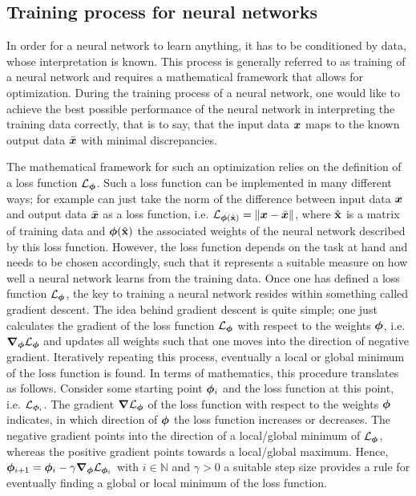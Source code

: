 \documentclass[a4paper,12pt]{report}
\def\lk#1{{\color{black}{#1}}}
\begin{document}
\subsection{Training process for neural networks}\label{sec:training}
In order for a neural network to learn anything, it has to be conditioned by data, whose interpretation is known. This process is generally referred to as training of a neural network and requires a mathematical framework that allows for optimization. During the training process of a neural network, one would like to achieve the best possible performance of the neural network in interpreting the training data correctly, that is to say, that the input data $\bm{x}$ maps to the known output data $\bar{\bm{x}}$ with minimal discrepancies.

The mathematical framework for such an optimization relies on the definition of a loss function $\mathcal{L}_{\bm{\phi}}$. Such a loss function can be implemented in many different ways; for example \lk{one} can just take the norm of the difference between input data $\bm{x}$ and output data $\bar{\bm{x}}$ as a loss function, i.e. $\mathcal{L}_{\bm{\phi}(\hat{\boldsymbol{\mathbf{x}}})} = \|\bm{x}-\bar{\bm{x}}\|$, where $\hat{\boldsymbol{\mathbf{x}}}$ is a matrix of training data and $\bm{\phi}(\hat{\boldsymbol{\mathbf{x}}})$ the associated weights of the neural network described by this loss function. However, the loss function depends on the task at hand and needs to be chosen accordingly, such that it represents a suitable measure on how well a neural network learns from the training data. Once one has defined a loss function $\mathcal{L}_{\bm{\phi}}$, the key to training a neural network resides within something called gradient descent. The idea behind gradient descent is quite simple; one just calculates the gradient of the loss function $\mathcal{L}_{\bm{\phi}}$ with respect to the weights $\bm{\phi}$, i.e. $\bm{\nabla}_{\bm{\phi}}\mathcal{L}_{\bm{\phi}}$ and updates all weights such that one moves into the direction of negative gradient. Iteratively repeating this process, eventually a local or global minimum of the loss function is found. In terms of mathematics, this procedure translates as follows. Consider some starting point $\bm{\phi}_i$ and the loss function at this point, i.e. $\mathcal{L}_{\bm{\phi}_i}$. The gradient $\bm{\nabla}\mathcal{L}_{\bm{\phi}}$ of the loss function with respect to the weights $\bm{\phi}$ indicates, in which direction of $\bm{\phi}$ the loss function increases or decreases. The negative gradient points into the direction of a local/global minimum of $\mathcal{L}_{\bm{\phi}}$, whereas the positive gradient points towards a local/global maximum. Hence, $\bm{\phi}_{i+1} = \bm{\phi}_{i} - \gamma \bm{\nabla}_{\bm{\phi}}\mathcal{L}_{\bm{\phi}_i}$ with $i \in \mathbb{N}$ and $\gamma > 0$ a suitable step size provides a rule for eventually finding a global or local minimum of the loss function. 
\end{document}
